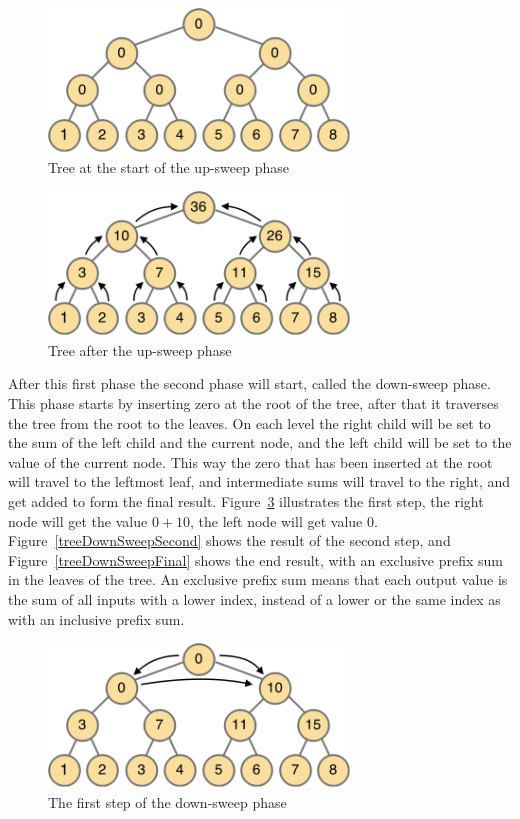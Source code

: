 \documentclass[a4paper]{article}
\begin{document}
\begin{figure}[htb!]
	\centering
	\includegraphics[width=80mm]{../images/tree-start.png}
	\caption{Tree at the start of the up-sweep phase}
	\label{treeStart}
\end{figure}

\begin{figure}[htb!]
	\centering
	\includegraphics[width=80mm]{../images/tree-upsweep.png}
	\caption{Tree after the up-sweep phase}
	\label{treeUpSweep}
\end{figure}

After this first phase the second phase will start, called the down-sweep phase. This phase starts by inserting zero at the root of the tree, after that it traverses the tree from the root to the leaves. On each level the right child will be set to the sum of the left child and the current node, and the left child will be set to the value of the current node. This way the zero that has been inserted at the root will travel to the leftmost leaf, and intermediate sums will travel to the right, and get added to form the final result. Figure~\ref{treeDownSweepFirst} illustrates the first step, the right node will get the value $0+10$, the left node will get value $0$. Figure~\ref{treeDownSweepSecond} shows the result of the second step, and Figure~\ref{treeDownSweepFinal} shows the end result, with an exclusive prefix sum in the leaves of the tree. An exclusive prefix sum means that each output value is the sum of all inputs with a lower index, instead of a lower or the same index as with an inclusive prefix sum.

\begin{figure}[htb!]
	\centering
	\includegraphics[width=80mm]{../images/tree-downsweep-first.png}
	\caption{The first step of the down-sweep phase}
	\label{treeDownSweepFirst}
\end{figure}
\end{document}
